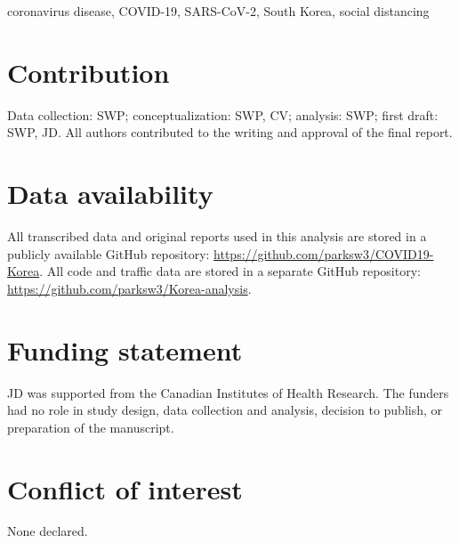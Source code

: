 coronavirus disease, COVID-19, SARS-CoV-2, South Korea, social distancing

\section*{Contribution}

Data collection: SWP; conceptualization: SWP, CV; analysis: SWP; first draft: SWP, JD. All authors contributed to the writing and approval of the final report.

\section*{Data availability}

All transcribed data and original reports used in this analysis are stored in a publicly available GitHub repository: \url{https://github.com/parksw3/COVID19-Korea}.
All code and traffic data are stored in a separate GitHub repository: \url{https://github.com/parksw3/Korea-analysis}.

\section*{Funding statement}

JD was supported from the Canadian Institutes of Health Research. The funders had no role in study design, data collection and analysis, decision to publish, or preparation of the manuscript.

\section*{Conflict of interest}

None declared.